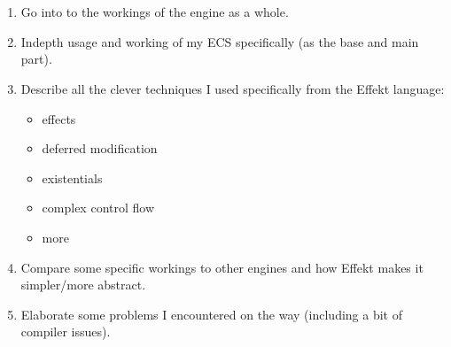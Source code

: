 \chapter{}\label{chap:math}

\begin{enumerate}
\item Go into to the workings of the engine as a whole.
\item Indepth usage and working of my ECS specifically (as the base and main part).
\item Describe all the clever techniques I used specifically from the Effekt language:
\begin{itemize}
	\item effects
	\item deferred modification
	\item existentials
	\item complex control flow
	\item more
\end{itemize}
\item Compare some specific workings to other engines and how Effekt makes it simpler/more abstract.
\item Elaborate some problems I encountered on the way (including a bit of compiler issues).
\end{enumerate}
